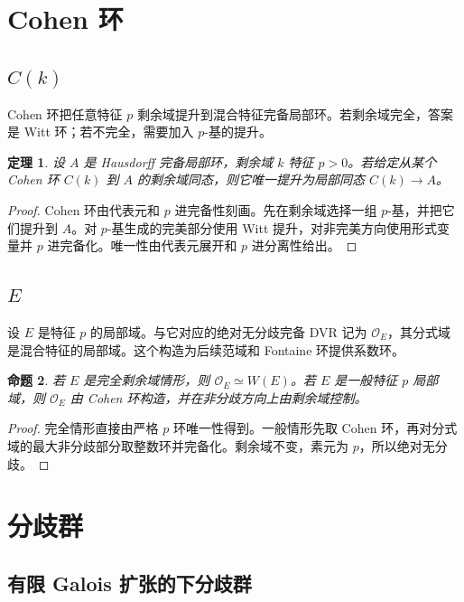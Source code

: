 \documentclass[11pt,a4paper,openany]{ctexbook}
\numberwithin{equation}{chapter}
\theoremstyle{plain}
\newtheorem{theorem}{定理}[chapter]
\newtheorem{proposition}[theorem]{命题}
\theoremstyle{definition}
\theoremstyle{remark}
\begin{document}
\section{Cohen 环}

\subsection{\texorpdfstring{$C(k)$}{C(k)}}

Cohen 环把任意特征 $p$ 剩余域提升到混合特征完备局部环。若剩余域完全，答案是 Witt 环；若不完全，需要加入 $p$-基的提升。

\begin{theorem}
设 $A$ 是 Hausdorff 完备局部环，剩余域 $k$ 特征 $p>0$。若给定从某个 Cohen 环 $C(k)$ 到 $A$ 的剩余域同态，则它唯一提升为局部同态 $C(k)\to A$。
\end{theorem}

\begin{proof}
Cohen 环由代表元和 $p$ 进完备性刻画。先在剩余域选择一组 $p$-基，并把它们提升到 $A$。对 $p$-基生成的完美部分使用 Witt 提升，对非完美方向使用形式变量并 $p$ 进完备化。唯一性由代表元展开和 $p$ 进分离性给出。
\end{proof}

\subsection{\texorpdfstring{$E$}{E}}

设 $E$ 是特征 $p$ 的局部域。与它对应的绝对无分歧完备 DVR 记为 $\mathcal O_E$，其分式域是混合特征的局部域。这个构造为后续范域和 Fontaine 环提供系数环。

\begin{proposition}
若 $E$ 是完全剩余域情形，则 $\mathcal O_E\simeq W(E)$。若 $E$ 是一般特征 $p$ 局部域，则 $\mathcal O_E$ 由 Cohen 环构造，并在非分歧方向上由剩余域控制。
\end{proposition}

\begin{proof}
完全情形直接由严格 $p$ 环唯一性得到。一般情形先取 Cohen 环，再对分式域的最大非分歧部分取整数环并完备化。剩余域不变，素元为 $p$，所以绝对无分歧。
\end{proof}

\section{分歧群}

\subsection{有限 Galois 扩张的下分歧群}
\end{document}

